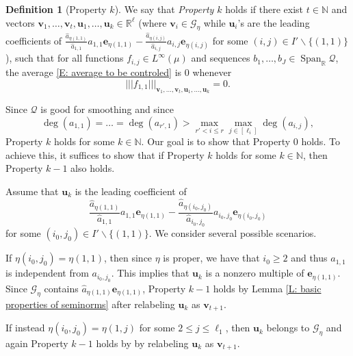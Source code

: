 \documentclass[11pt]{amsart}
\theoremstyle{definition}
\newtheorem{definition}[lemma]{Definition}
\newcommand{\N}{{\mathbb N}}
\newcommand{\R}{{\mathbb R}}
\newcommand{\CG}{{\mathcal G}}
\newcommand{\CQ}{{\mathcal Q}}
\newcommand{\be}{{\mathbf{e}}}
\newcommand{\bu}{{\mathbf{u}}}
\newcommand{\bv}{{\mathbf{v}}}
\newcommand{\nnorm}[1]{\lvert\!|\!| #1|\!|\!\rvert}
\newcommand{\1}{{\mathbf{1}}}
\DeclareMathOperator{\Span}{Span}
\begin{document}
\begin{definition}[Property $k$]
    We say that \emph{Property $k$} holds if there exist $t\in\N$ and vectors  $\bv_1, \ldots, \bv_t, \bu_1, \ldots, \bu_k\in\R^\ell$ (where $\bv_i\in \CG_{\eta}$ while $\bu_i$'s are the leading coefficients of $\frac{\hat{a}_{\eta(1,1)}}{\hat{a}_{1,1}}a_{1,1}\be_{\eta(1,1)}-\frac{\hat{a}_{\eta(i,j)}}{\hat{a}_{i,j}}a_{i,j}\be_{\eta(i,j)}$ for some $(i,j)\in I'\backslash\{(1,1)\}$), such that for all functions $f_{i,j}\in L^\infty(\mu)$ and sequences $b_1, \ldots, b_J\in\Span_\R\CQ$, the average \eqref{E: average to be controled} is 0 whenever $$\nnorm{f_{1,1}}_{\bv_{1},\dots,\bv_{t},\bu_{1},\dots,\bu_k}=0.$$
\end{definition}
Since $\CQ$ is good for smoothing %
and since $$\deg(a_{1,1})=\dots=\deg(a_{r',1})>\max_{r'< i\leq r}\max_{j\in[\ell_i]}\deg(a_{i,j}),$$  Property $k$ holds for some $k\in\N$.     
 Our goal is to show that Property 0 holds. To achieve this, it suffices to show that if Property $k$ holds for some $k\in\N$, then Property $k-1$ also holds.
     
      

          Assume that 
$\bu_k$ is the leading coefficient of $$\frac{\hat{a}_{\eta(1,1)}}{\hat{a}_{1,1}}a_{1,1}\be_{\eta(1,1)}-\frac{\hat{a}_{\eta(i_{0},j_{0})}}{\hat{a}_{i_{0},j_{0}}}a_{i_{0},j_{0}}\be_{\eta(i_{0},j_{0})}$$ for some $(i_{0},j_{0})\in I'\backslash\{(1,1)\}$. We consider several possible scenarios.

If $\eta(i_{0},j_{0})=\eta(1,1)$, then since $\eta$ is proper, we have that $i_{0}\geq 2$ and thus $a_{1,1}$ is independent from $a_{i_{0},j_{0}}$. This implies that $\bu_k$ is a nonzero multiple of $\be_{\eta(1,1)}$. Since $\CG_{\eta}$ contains $\hat{a}_{\eta(1,1)}\be_{\eta(1,1)}$, Property $k-1$ holds by Lemma \ref{L: basic properties of seminorms} after relabeling $\bu_k$ as $\bv_{t+1}$. 

If instead $\eta(i_{0},j_{0})=\eta(1,j)$ for some $2\leq j\leq \ell_1$, then $\bu_k$ belongs to $\CG_{\eta}$ and again Property $k-1$ holds by by relabeling $\bu_k$ as $\bv_{t+1}$.
       
\end{document}
